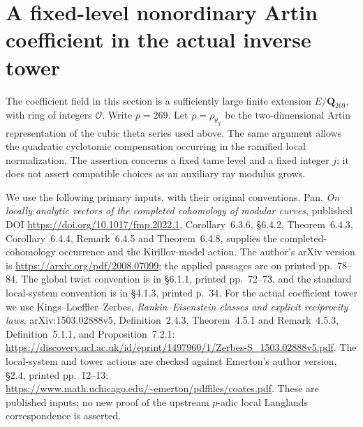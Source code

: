 \section{A fixed-level nonordinary Artin coefficient in the actual inverse tower}

The coefficient field in this section is a sufficiently large finite extension
\(E/\mathbf Q_{269}\), with ring of integers \(\mathcal O\).  Write \(p=269\).
Let \(\rho=\rho_{\theta_\chi}\) be the two-dimensional Artin representation
of the cubic theta series used above.  The same argument allows the
quadratic cyclotomic compensation occurring in the ramified local
normalization.  The assertion concerns a fixed tame level and a fixed
integer \(j\); it does not assert compatible choices as an auxiliary ray
modulus grows.

We use the following primary inputs, with their original conventions.
Pan, \emph{On locally analytic vectors of the completed cohomology of
modular curves}, published DOI \url{https://doi.org/10.1017/fmp.2022.1},
Corollary~6.3.6, \S6.4.2, Theorem~6.4.3, Corollary~6.4.4,
Remark~6.4.5 and Theorem~6.4.8, supplies the completed-cohomology
occurrence and the Kirillov-model action.  The author's arXiv version is
\url{https://arxiv.org/pdf/2008.07099}; the applied passages are on
printed pp.~78--84.  The global twist convention is in \S6.1.1,
printed pp.~72--73, and the standard local-system convention is in
\S4.1.3, printed p.~34.
For the actual coefficient tower we use Kings--Loeffler--Zerbes,
\emph{Rankin--Eisenstein classes and explicit reciprocity laws},
arXiv:1503.02888v5, Definition~2.4.3, Theorem~4.5.1 and
Remark~4.5.3, Definition~5.1.1, and Proposition~7.2.1:
\url{https://discovery.ucl.ac.uk/id/eprint/1497960/1/Zerbes-S_1503.02888v5.pdf}.
The local-system and tower actions are checked against Emerton's
author version, \S2.4, printed pp.~12--13:
\url{https://www.math.uchicago.edu/~emerton/pdffiles/coates.pdf}.
These are published inputs; no new proof of the upstream
\(p\)-adic local Langlands correspondence is asserted.

